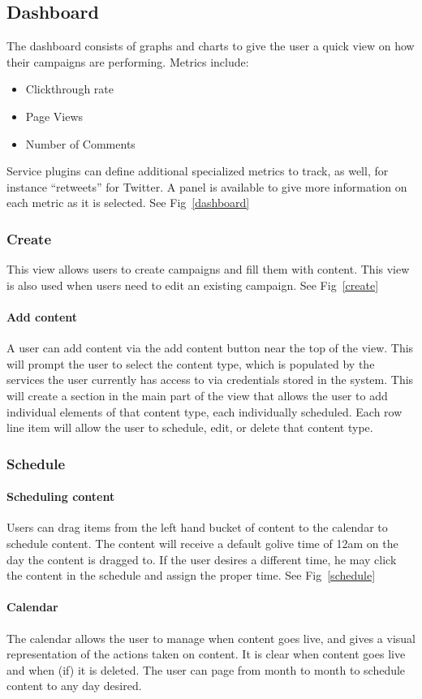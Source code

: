 \documentclass{article}
\begin{document}
\subsection{Dashboard}
The dashboard consists of graphs and charts to give the user a quick
view on how their campaigns are performing.  Metrics include:
\begin{itemize}
\item Clickthrough rate
\item Page Views
\item Number of Comments
\end{itemize}
Service plugins can define additional specialized metrics to track, as
well, for instance ``retweets'' for Twitter.  A panel is available to
give more information on each metric as it is selected. See Fig~\ref{dashboard}
\subsubsection{Create}
This view allows users to create campaigns and fill them with content.
This view is also used when users need to edit an existing
campaign. See Fig~\ref{create}
\paragraph{Add content}
A user can add content via the add content button near the top of the
view.  This will prompt the user to select the content type, which is
populated by the services the user currently has access to via
credentials stored in the system. This will create a section in the
main part of the view that allows the user to add individual elements
of that content type, each individually scheduled.  Each row line item
will allow the user to schedule, edit, or delete that content type.
\subsubsection{Schedule}
\paragraph{Scheduling content}
Users can drag items from the left hand bucket of content to the
calendar to schedule content.  The content will receive a default
golive time of 12am on the day the content is dragged to.  If the user
desires a different time, he may click the content in the schedule and
assign the proper time. See Fig~\ref{schedule}
\paragraph{Calendar}
The calendar allows the user to manage when content goes live, and
gives a visual representation of the actions taken on content.  It is
clear when content goes live and when (if) it is deleted.  The user
can page from month to month to schedule content to any day desired.
\end{document}
